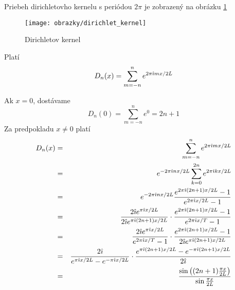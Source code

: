 Priebeh dirichletovho kernelu s periódou $2\pi$ je zobrazený na
obrázku
\ref{fig:dirichlet_kernel}

\begin{figure}[htp]
    \centering
    \texttt{[image: obrazky/dirichlet\_kernel]}
    \caption{Dirichletov kernel}
    \label{fig:dirichlet_kernel}
\end{figure}

\begin{lema}
    Platí
    \begin{equation}
        D_n(x) = \sum_{m=-n}^{n} e^{2 \pi \hat{\imath} m x/2L}
        \label{eq:dirichlet_kernel_alternative}
    \end{equation}
\end{lema}
\begin{dokaz}
    Ak $x=0$, dostávame
    \begin{equation}
        D_n(0) = \sum_{m=-n}^{n} e^0 = 2n+1
    \end{equation}
    Za predpokladu $x\not=0$ platí
    \begin{eqnarray}
        D_n(x) &=& \sum_{m=-n}^n e^{2 \pi \hat{\imath} m x/2L} \\
               &=& e^{-2 \pi \hat{\imath} n x/2L} \sum_{k=0}^{2n} 
                        e^{2 \pi \hat{\imath} k x/2L} \\
               &=& e^{-2 \pi \hat{\imath} n x/2L} 
                \frac{e^{2 \pi \hat{\imath} (2n+1) x /2L}-1}{e^{2 \pi \hat{\imath}
                x/2L}-1} \\
                &=& \frac{2 \hat{\imath} e^{\pi\hat{\imath} x/2L}}{
                          2 \hat{\imath} e^{\pi\hat{\imath} (2n+1) x/2L}} \cdot
                \frac{e^{2 \pi \hat{\imath} (2n+1) x /2L}-1}{e^{2 \pi \hat{\imath}
                x/T}-1} \\
                &=& \frac{2 \hat{\imath} e^{\pi \hat{\imath} x/2L}}{
                    e^{2 \pi \hat{\imath} x/T}-1} \cdot
                    \frac{e^{2 \pi \hat{\imath} (2n+1) x /2L}-1}{
                        2 \hat{\imath} e^{\pi\hat{\imath} (2n+1) x/2L}}\\
                &=& \frac{2 \hat{\imath}}{
                    e^{\pi \hat{\imath} x/2L}-e^{-\pi \hat{\imath} x/2L}} \cdot
                    \frac{e^{\pi \hat{\imath} (2n+1) x /2L}-
                        e^{-\pi \hat{\imath} (2n+1) x /2L}
                    }{2 \hat{\imath}}\\
                &=& \frac{\sin\left( (2n+1)\frac{\pi x}{2L} \right)}
                        {\sin \frac{\pi x}{2L}}
    \end{eqnarray}
\end{dokaz}

